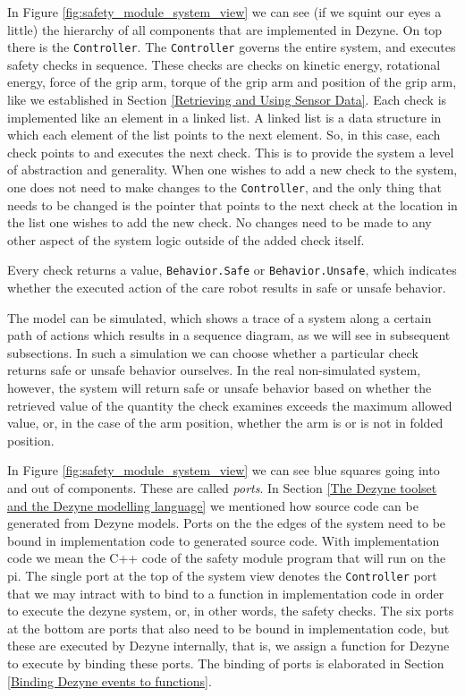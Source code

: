 \documentclass[12pt]{scrreprt}
\begin{document}
In Figure \ref{fig:safety_module_system_view} we can see (if we squint our eyes a little) the hierarchy of all components that are implemented in Dezyne. On top there is the \texttt{Controller}. The \texttt{Controller} governs the entire system, and executes safety checks in sequence. These checks are checks on kinetic energy, rotational energy, force of the grip arm, torque of the grip arm and position of the grip arm, like we established in Section \ref{Retrieving and Using Sensor Data}. Each check is implemented like an element in a linked list. A linked list is a data structure in which each element of the list points to the next element. So, in this case, each check points to and executes the next check. This is to provide the system a level of abstraction and generality. When one wishes to add a new check to the system, one does not need to make changes to the \texttt{Controller}, and the only thing that needs to be changed is the pointer that points to the next check at the location in the list one wishes to add the new check. No changes need to be made to any other aspect of the system logic outside of the added check itself.
\par
Every check returns a value, \texttt{Behavior.Safe} or \texttt{Behavior.Unsafe}, which indicates whether the executed action of the care robot results in safe or unsafe behavior. 
\par
The model can be simulated, which shows a trace of a system along a certain path of actions which results in a sequence diagram, as we will see in subsequent subsections. In such a simulation we can choose whether a particular check returns safe or unsafe behavior ourselves. In the real non-simulated system, however, the system will return safe or unsafe behavior based on whether the retrieved value of the quantity the check examines exceeds the maximum allowed value, or, in the case of the arm position, whether the arm is or is not in folded position. 
\par
In Figure \ref{fig:safety_module_system_view} we can see blue squares going into and out of components. These are called \textit{ports}. In Section \ref{The Dezyne toolset and the Dezyne modelling language} we mentioned how source code can be generated from Dezyne models. Ports on the the edges of the system need to be bound in implementation code to generated source code. With implementation code we mean the C++ code of the safety module program that will run on the \gls{pi}. The single port at the top of the system view denotes the \texttt{Controller} port that we may intract with to bind to a function in implementation code in order to execute the dezyne system, or, in other words, the safety checks. The six ports at the bottom are ports that also need to be bound in implementation code, but these are executed by Dezyne internally, that is, we assign a function for Dezyne to execute by binding these ports. The binding of ports is elaborated in Section \ref{Binding Dezyne events to functions}.
\end{document}
